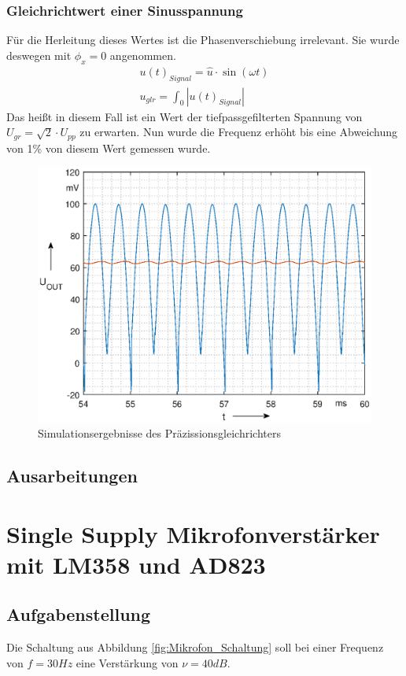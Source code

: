 \subsubsection{Gleichrichtwert einer Sinusspannung}
Für die Herleitung dieses Wertes ist die Phasenverschiebung irrelevant. Sie wurde deswegen mit $\phi_x = 0$ angenommen. 
\begin{align}
    u(t)_{Signal} =  \hat{u} \cdot \sin(\omega t) \\   
    u_{glr} = \int_{0}{|u(t)_{Signal}|}
\end{align}
Das heißt in diesem Fall ist ein Wert der tiefpassgefilterten Spannung von $U_{gr} =\sqrt{2}\cdot U_{pp}$ zu erwarten. Nun wurde die Frequenz erhöht bis eine Abweichung von 1\% von diesem Wert gemessen wurde. 
\begin{figure}[H]
    \centering
    \includegraphics[width=\textwidth]{Lab_3/Plots/Gleichrichter.eps}
    \caption{Simulationsergebnisse des Präzissionsgleichrichters}
    \label{fig:sim_Gleichrichter}
\end{figure}
\subsection{Ausarbeitungen}

\section{Single Supply Mikrofonverstärker mit LM358 und AD823}
\subsection{Aufgabenstellung}
Die Schaltung aus Abbildung \ref{fig:Mikrofon_Schaltung} soll bei einer Frequenz von $f=30Hz$ eine Verstärkung von $\nu = 40dB$. 

